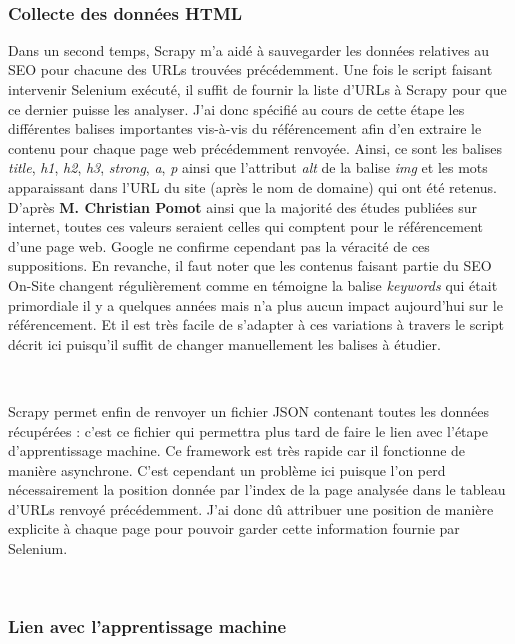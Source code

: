 \documentclass[12pt]{article}
\begin{document}
\

\subsubsection{Collecte des données HTML}
 
Dans un second temps, \textsf{Scrapy} m'a aidé à sauvegarder les données relatives au SEO pour chacune des URLs trouvées précédemment. Une fois le script faisant intervenir \textsf{Selenium} exécuté, il suffit de fournir la liste d'URLs à \textsf{Scrapy} pour que ce dernier puisse les analyser. J'ai donc spécifié au cours de cette étape les différentes balises importantes vis-à-vis du référencement afin d'en extraire le contenu pour chaque page web précédemment renvoyée. Ainsi, ce sont les balises \textit{title}, \textit{h1}, \textit{h2}, \textit{h3}, \textit{strong}, \textit{a}, \textit{p} ainsi que l'attribut \textit{alt} de la balise \textit{img} et les mots apparaissant dans l'URL du site (après le nom de domaine) qui ont été retenus. D'après \textbf{M. Christian Pomot} ainsi que la majorité des études publiées sur internet, toutes ces valeurs seraient celles qui comptent pour le référencement d'une page web. Google ne confirme cependant pas la véracité de ces suppositions. En revanche, il faut noter que les contenus faisant partie du SEO On-Site changent régulièrement comme en témoigne la balise \textit{keywords} qui était primordiale il y a quelques années mais n'a plus aucun impact aujourd'hui sur le référencement. Et il est très facile de s'adapter à ces variations à travers le script décrit ici puisqu'il suffit de changer manuellement les balises à étudier. 

\

\textsf{Scrapy} permet enfin de renvoyer un fichier \textsf{JSON} contenant toutes les données récupérées : c'est ce fichier qui permettra plus tard de faire le lien avec l'étape d'apprentissage machine. Ce framework est très rapide car il fonctionne de manière asynchrone. C'est cependant un problème ici puisque l'on perd nécessairement la position donnée par l'index de la page analysée dans le tableau d'URLs renvoyé précédemment. J'ai donc dû attribuer une position de manière explicite à chaque page pour pouvoir garder cette information fournie par \textsf{Selenium}.

\

\subsubsection{Lien avec l'apprentissage machine}
\end{document}
